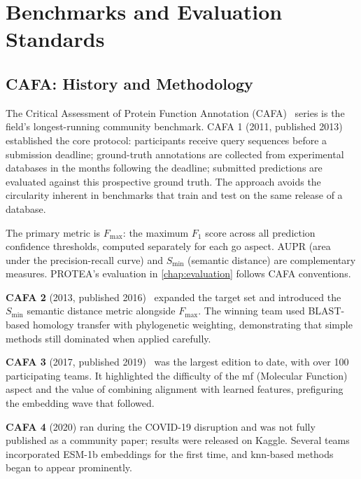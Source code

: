 \section{Benchmarks and Evaluation Standards}
\label{sec:related-cafa}

\subsection{CAFA: History and Methodology}
\label{subsec:related-cafa-history}

The Critical Assessment of Protein Function Annotation (CAFA)~\cite{jiang2016cafa2}
series is the field's longest-running community benchmark. CAFA 1 (2011, published
2013)~\cite{radivojac2013cafa1} established the core protocol: participants receive
query sequences before a submission deadline; ground-truth annotations are
collected from experimental databases in the months following the deadline;
submitted predictions are evaluated against this prospective ground truth.
The approach avoids the circularity inherent in benchmarks that train and test on
the same release of a database.

The primary metric is $F_{\max}$: the maximum $F_1$ score across all
prediction confidence thresholds, computed separately for each \gls{go}
aspect. AUPR (area under the precision-recall curve) and $S_{\min}$ (semantic
distance) are complementary measures. PROTEA's evaluation in
\cref{chap:evaluation} follows CAFA conventions.

\textbf{CAFA 2} (2013, published 2016)~\cite{jiang2016cafa2} expanded the
target set and introduced the $S_{\min}$ semantic distance metric alongside
$F_{\max}$. The winning team used BLAST-based homology transfer with
phylogenetic weighting, demonstrating that simple methods still dominated when
applied carefully.

\textbf{CAFA 3} (2017, published 2019)~\cite{zhou2019cafa3} was the largest
edition to date, with over 100 participating teams. It highlighted the
difficulty of the \gls{mf} (Molecular Function) aspect and the value of combining
alignment with learned features, prefiguring the embedding wave that followed.

\textbf{CAFA 4} (2020) ran during the COVID-19 disruption and was not fully
published as a community paper; results were released on Kaggle. Several
teams incorporated ESM-1b embeddings for the first time, and \gls{knn}-based
methods began to appear prominently.

